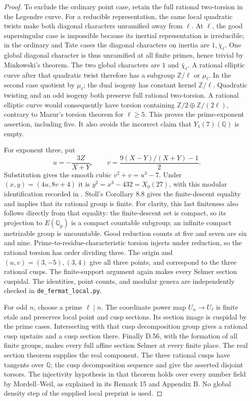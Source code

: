 \begin{proof}
To exclude the ordinary point case, retain
the full rational two-torsion in the
Legendre curve. For a reducible representation,
the same local quadratic twists make both
diagonal characters unramified away from
\(\ell\). At \(\ell\), the good supersingular
case is impossible because its inertial
representation is irreducible; in the
ordinary and Tate cases the diagonal
characters on inertia are \(1,\bar\chi_\ell\).
One global diagonal character is thus
unramified at all finite primes, hence
trivial by Minkowski's theorem. The two
global characters are \(1\) and
\(\bar\chi_\ell\). A rational elliptic
curve after that quadratic twist therefore
has a subgroup \(\mathbb Z/\ell\) or
\(\mu_\ell\). In the second case quotient
by \(\mu_\ell\); the dual isogeny has
constant kernel \(\mathbb Z/\ell\).
Quadratic twisting and an odd isogeny both
preserve full rational two-torsion. A
rational elliptic curve would consequently
have torsion containing
\(\mathbb Z/2\oplus\mathbb Z/(2\ell)\),
contrary to Mazur's torsion theorem
\cite[Theorem (8)]{DE_Mazur1977} for \(\ell\ge5\).
This proves the prime-exponent assertion,
including five. It also avoids the incorrect
claim that \(Y_1(7)(\mathbb Q)\) is empty.

For exponent three, put
\[
 u=-\frac{3Z}{X+Y},\qquad
 v=\frac{9(X-Y)/(X+Y)-1}{2}.
\]
Substitution gives the smooth cubic
\(v^2+v=u^3-7\). Under
\((x,y)=(4u,8v+4)\) it is
\(y^2=x^3-432=X_0(27)\), with this modular
identification recorded in
\cite[\S10.1]{DE_KrizLi2019}.
Stoll's Corollary 8.8 gives the finite-descent
equality and implies that its rational
group is finite. For clarity, this last
finiteness also follows directly from that
equality: the finite-descent set is compact,
so its projection to \(E(\mathbb Q_p)\) is
a compact countable subgroup; an infinite
compact metrizable group is uncountable.
Good reduction counts at five and seven
are six and nine. Prime-to-residue-characteristic
torsion injects under reduction, so the
rational torsion has order dividing three.
The origin and \((u,v)=(3,-5),(3,4)\) give
all three points, and correspond to the
three rational cusps. The finite-support
argument again makes every Selmer section
cuspidal. The identities, point counts,
and modular genera are independently checked
in \texttt{de\_fermat\_local.py}.

For odd \(n\), choose a prime \(\ell\mid n\).
The coordinate power map \(U_n\to U_\ell\)
is finite etale and preserves local point
and cusp sections. Its section image is
cuspidal by the prime cases. Intersecting
with that cusp decomposition group gives
a rational cusp upstairs and a cusp
section there. Finally D.56, with the
formation of all finite groups, makes every
full affine section Selmer at every finite place. The real
section theorem supplies the real component.
The three rational cusps have tangents over
\(\mathbb Q\); the cusp decomposition sequence
and \cite[Proposition 8 and Theorem 14]{fghStix}
give the asserted disjoint torsors. The
injectivity hypothesis in that theorem holds
over every number field by Mordell--Weil,
as explained in its Remark 15 and Appendix B. No
global density step of the supplied local
preprint is used.
\end{proof}

